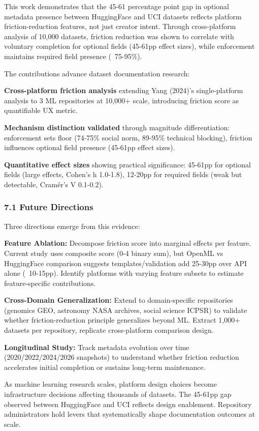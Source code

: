
This work demonstrates that the 45-61 percentage point gap in optional metadata presence between HuggingFace and UCI datasets reflects platform friction-reduction features, not just creator intent. Through cross-platform analysis of 10,000 datasets, friction reduction was shown to correlate with voluntary completion for optional fields (45-61pp effect sizes), while enforcement maintains required field presence (~75-95\%).

The contributions advance dataset documentation research:

\textbf{Cross-platform friction analysis} extending Yang (2024)'s single-platform analysis to 3 ML repositories at 10,000+ scale, introducing friction score as quantifiable UX metric.

\textbf{Mechanism distinction validated} through magnitude differentiation: enforcement sets floor (74-75\% social norm, 89-95\% technical blocking), friction influences optional field presence (45-61pp effect sizes).

\textbf{Quantitative effect sizes} showing practical significance: 45-61pp for optional fields (large effects, Cohen's h 1.0-1.8), 12-20pp for required fields (weak but detectable, Cramér's V 0.1-0.2).

\subsubsection{7.1 Future Directions}

Three directions emerge from this evidence:

\textbf{Feature Ablation:} Decompose friction score into marginal effects per feature. Current study uses composite score (0-4 binary sum), but OpenML vs HuggingFace comparison suggests templates/validation add 25-30pp over API alone (~10-15pp). Identify platforms with varying feature subsets to estimate feature-specific contributions.

\textbf{Cross-Domain Generalization:} Extend to domain-specific repositories (genomics GEO, astronomy NASA archives, social science ICPSR) to validate whether friction-reduction principle generalizes beyond ML. Extract 1,000+ datasets per repository, replicate cross-platform comparison design.

\textbf{Longitudinal Study:} Track metadata evolution over time (2020/2022/2024/2026 snapshots) to understand whether friction reduction accelerates initial completion or sustains long-term maintenance.

As machine learning research scales, platform design choices become infrastructure decisions affecting thousands of datasets. The 45-61pp gap observed between HuggingFace and UCI reflects design enablement. Repository administrators hold levers that systematically shape documentation outcomes at scale.
